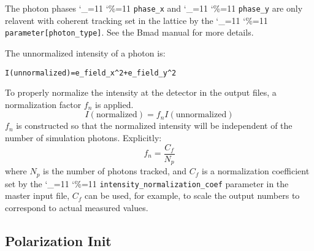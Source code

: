 \documentclass[11pt]{article}
\newcommand{\Begineq}{\begin{equation}}
\newcommand{\Endeq}{\end{equation}}
\newcommand\ttcmd{\begingroup\catcode`\_=11 \catcode`\%=11 \dottcmd}
\newcommand\dottcmd[1]{\texttt{#1}\endgroup}
\newcommand{\vn}{\ttcmd}
\newenvironment{example}
  {\vspace{\ExBeg} \begin{alltt}}
  {\end{alltt} \vspace{\ExEnd}}
\newlength{\ExBeg}
\newlength{\ExEnd}
\begin{document}
The photon phases \vn{phase_x} and \vn{phase_y} are only relavent with
coherent tracking set in the lattice by the
\vn{parameter[photon_type]}. See the Bmad manual for more details.

The unnormalized intensity of a photon is:
\begin{example}
  I(unnormalized) = e_field_x^2 + e_field_y^2
\end{example}

To properly normalize the intensity at the detector in the output
files, a normalization factor $f_n$ is applied.
\Begineq
  I (\mbox{normalized}) = f_n I (\mbox{unnormalized}) 
\Endeq
$f_n$ is constructed so that the normalized intensity will be
independent of the number of simulation photons. Explicitly:
\Begineq
  f_n = \frac{C_f}{N_p}
\Endeq
where $N_p$ is the number of photons tracked, and $C_f$ is a
normalization coefficient set by the \vn{intensity_normalization_coef}
parameter in the master input file, $C_f$ can be used, for example, to
scale the output numbers to correspond to actual measured values.

\subsection{Polarization Init}
\end{document}
